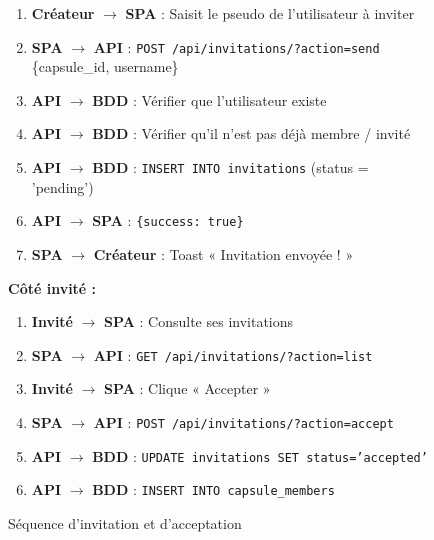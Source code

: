 \documentclass[12pt,a4paper]{report}
\begin{document}
\begin{figure}[H]
    \centering
    \begin{tcolorbox}[colback=codebg, colframe=codeframe, width=\textwidth, title={\textbf{Diagramme de séquence — Invitation}}]
        \small
        \begin{enumerate}[noitemsep]
            \item \textbf{Créateur} $\rightarrow$ \textbf{SPA} : Saisit le pseudo de l'utilisateur à inviter
            \item \textbf{SPA} $\rightarrow$ \textbf{API} : \texttt{POST /api/invitations/?action=send} \{capsule\_id, username\}
            \item \textbf{API} $\rightarrow$ \textbf{BDD} : Vérifier que l'utilisateur existe
            \item \textbf{API} $\rightarrow$ \textbf{BDD} : Vérifier qu'il n'est pas déjà membre / invité
            \item \textbf{API} $\rightarrow$ \textbf{BDD} : \texttt{INSERT INTO invitations} (status = 'pending')
            \item \textbf{API} $\rightarrow$ \textbf{SPA} : \texttt{\{success: true\}}
            \item \textbf{SPA} $\rightarrow$ \textbf{Créateur} : Toast « Invitation envoyée ! »
        \end{enumerate}

        \vspace{0.3cm}
        \textbf{Côté invité :}
        \begin{enumerate}[noitemsep]
            \item \textbf{Invité} $\rightarrow$ \textbf{SPA} : Consulte ses invitations
            \item \textbf{SPA} $\rightarrow$ \textbf{API} : \texttt{GET /api/invitations/?action=list}
            \item \textbf{Invité} $\rightarrow$ \textbf{SPA} : Clique « Accepter »
            \item \textbf{SPA} $\rightarrow$ \textbf{API} : \texttt{POST /api/invitations/?action=accept}
            \item \textbf{API} $\rightarrow$ \textbf{BDD} : \texttt{UPDATE invitations SET status='accepted'}
            \item \textbf{API} $\rightarrow$ \textbf{BDD} : \texttt{INSERT INTO capsule\_members}
        \end{enumerate}
    \end{tcolorbox}
    \caption{Séquence d'invitation et d'acceptation}
\end{figure}
\end{document}
